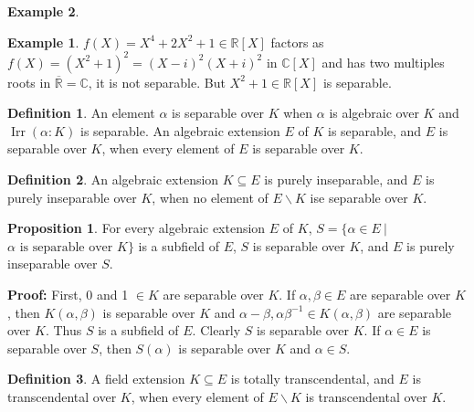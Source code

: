 \documentclass[11pt]{amsbook}%
\theoremstyle{plain}
\theoremstyle{definition}
\newtheorem{definition*}{Definition}
\newtheorem*{example*}{Example}
\newtheorem{proposition}[theorem]{Proposition}
\numberwithin{equation}{section}
\newcommand{\CC}{\mathbb C}
\newcommand{\RR}{\mathbb R}
\renewcommand{\proof}{ \textbf{Proof: }}
\DeclareMathOperator{\Irr}{Irr}
\begin{document}
\begin{example*}
\begin{example*}
  $f(X) = X^{4} + 2X^{2} + 1 \in \RR[X]$ factors as $f(X) = (X^{2} + 1)^{2} = (X - i)^{2}(X + i)^{2}$ in $\CC[X]$
  and has two multiples roots in $\overline{\RR} = \CC$, it is not separable. But $X^{2} + 1 \in \RR[X]$
  is separable.
\end{example*}

\begin{definition*}
  An element $\alpha$ is separable over $K$ when $\alpha$ is algebraic over $K$ and $\Irr(\alpha:K)$
  is separable. An algebraic extension $E$ of $K$ is separable, and $E$
  is separable over $K$, when every element of $E$ is separable over $K$.
\end{definition*}

\begin{definition*}
  \label{def-purely-inseparable}
  An algebraic extension $K \subseteq E$ is purely inseparable, and $E$ is purely
  inseparable over $K$, when no element of $E \backslash K$ ise separable over $K$.
\end{definition*}

\begin{proposition}
  For every algebraic extension $E$ of $K$, $S = \{\alpha \in E \ | \ $
  $\alpha \text{ is separable over } K \}$
  is a subfield of $E$, $S$ is separable over $K$, and $E$ is purely inseparable over $S$.
\end{proposition} \vspace{1.8em}
\proof First, 0 and 1 $\in K$ are separable over $K$. If $\alpha, \beta \in E$ are separable
over $K$, then $K(\alpha, \beta)$ is separable over $K$ and $\alpha - \beta, \alpha\beta^{-1} \in K(\alpha, \beta)$
are separable over $K$. Thus $S$ is a subfield of $E$. Clearly $S$ is separable over $K$.
If $\alpha \in E$ is separable over $S$, then $S(\alpha)$ is separable over $K$ and $\alpha \in S$. \qedsymbol

\begin{definition*}
  A field extension $K \subseteq E$ is totally transcendental, and $E$ is
  transcendental over $K$, when every element of $E \backslash K$ is transcendental over $K$.
\end{definition*}



\end{example*}
\end{document}
